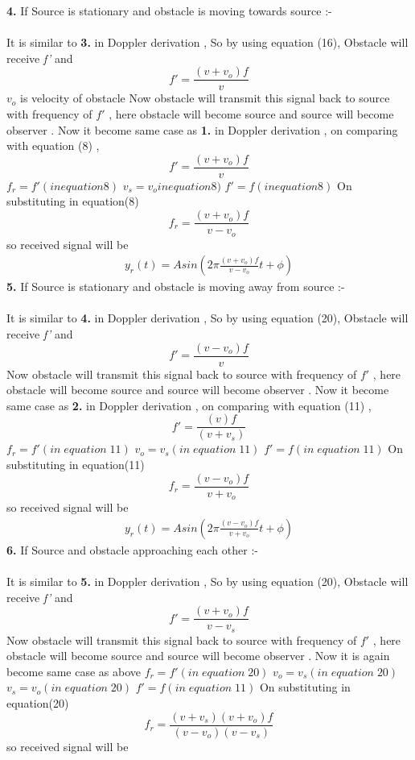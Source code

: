\documentclass[journal,12pt,twocolumn]{IEEEtran}
\theoremstyle{remark}
\begin{document}
 \textbf{4.} If Source is stationary and  obstacle is moving towards source :-\\\\
 It is similar to\textbf{ 3.} in Doppler derivation , So by using equation (16), Obstacle will receive \textit{f'} and 
 $$f' = \frac{(v+v_o) f}{v }$$
 $v_o$ is velocity of obstacle
 Now obstacle will transmit this signal back to source with frequency of $f'$ , here obstacle will become source and source will become observer . Now it become same case as \textbf{1.} in Doppler derivation , on comparing with equation (8) ,
 $$f' = \frac{(v+v_o) f}{v }$$
 $f_r=f'(in equation 8)$
 $v_s=v_oin equation 8)$
 $f'=f(in equation 8)$
 On substituting in equation(8)
 $$f_r = \frac{(v+v_o) f}{v- v_o }$$
  so received signal will be
 \begin{align}y_r(t) = Asin( 2 \pi  \frac{(v+v_o) f}{v- v_o }t + \phi )\end{align}
  \textbf{5.} If Source is stationary and  obstacle is moving away from source :-\\\\
 It is similar to\textbf{ 4.} in Doppler derivation , So by using equation (20), Obstacle will receive \textit{f'} and 
 $$f' = \frac{(v-v_o) f}{v }$$
 Now obstacle will transmit this signal back to source with frequency of $f'$ , here obstacle will become source and source will become observer . Now it become same case as \textbf{2.} in Doppler derivation , on comparing with equation (11) ,
 $$f' = \frac{(v) f}{(v+v_s) }$$
 $f_r=f'(in \;equation\; 11)$
 $v_o=v_s(in\; equation\; 11)$
 $f'=f(in\; equation \;11)$
 On substituting in equation(11)
 $$f_r = \frac{(v-v_o) f}{v+ v_o }$$
  so received signal will be
 \begin{align}y_r(t) = Asin( 2 \pi  \frac{(v-v_o) f}{v+ v_o }t + \phi )\end{align}
  \textbf{6.} If Source and  obstacle approaching each other :-\\\\
 It is similar to\textbf{ 5.} in Doppler derivation , So by using equation (20), Obstacle will receive \textit{f'} and 
 $$f' = \frac{(v+v_o) f}{v-v_s }$$
 Now obstacle will transmit this signal back to source with frequency of $f'$ , here obstacle will become source and source will become observer . Now it is again become same case as above
 $f_r=f'(in \;equation\; 20)$
 $v_o=v_s(in\; equation\; 20)$
  $v_s=v_o(in\; equation\; 20)$
 $f'=f(in\; equation \;11)$
 On substituting in equation(20)
 $$f_r = \frac{(v+v_s)(v+v_o) f}{(v- v_o)(v-v_s) }$$
  so received signal will be
\end{document}
